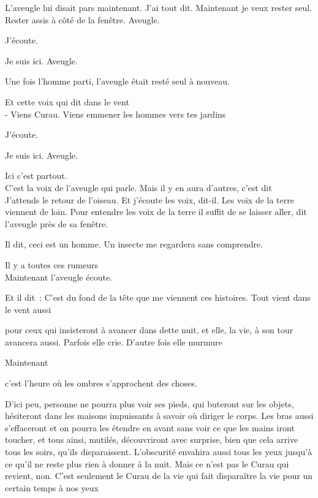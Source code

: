 L'aveugle lui disait pars maintenant. J'ai tout dit. Maintenant je veux
rester seul. Rester assis à côté de la fenêtre. Aveugle.

\pagebreak

J'écoute.

Je suis ici. Aveugle.

\pagebreak

Une fois l'homme parti, l'aveugle était resté seul à nouveau.

\pagebreak

Et cette voix qui dit dans le vent\\

- Viens Curau. Viens emmener les hommes vers tes jardins

\pagebreak

J'écoute.

Je suis ici. Aveugle.

Ici c'est partout.\\

C'est la voix de l'aveugle qui parle. Mais il y en aura d'autres, c'est
dit\\

J'attends le retour de l'oiseau. Et j'écoute les voix, dit-il. Les voix
de la terre viennent de loin. Pour entendre les voix de la terre il
suffit de se laisser aller, dit l'aveugle près de sa fenêtre.

Il dit, ceci est un homme. Un insecte me regardera sans comprendre.

Il y a toutes ces rumeurs\\

Maintenant l'aveugle écoute.

Et il dit~: C'est du fond de la tête que me viennent ces histoires. Tout
vient dans le vent aussi

pour ceux qui insisteront à avancer dans dette nuit, et elle, la vie, à
son tour avancera aussi. Parfois elle crie. D'autre fois elle murmure

\pagebreak

Maintenant

c'est l'heure où les ombres s'approchent des choses.

D'ici peu, personne ne pourra plus voir ses pieds, qui buteront sur les
objets, hésiteront dans les maisons impuissants à savoir où diriger le
corps. Les bras aussi s'effaceront et on pourra les étendre en avant
sans voir ce que les mains iront toucher, et tous ainsi, mutilés,
découvriront avec surprise, bien que cela arrive tous les soirs, qu'ils
disparaissent. L'obscurité envahira aussi tous les yeux jusqu'à ce qu'il
ne reste plus rien à donner à la nuit. Mais ce n'est pas le Curau qui
revient, non. C'est seulement le Curau de la vie qui fait disparaître la
vie pour un certain temps à nos yeux

